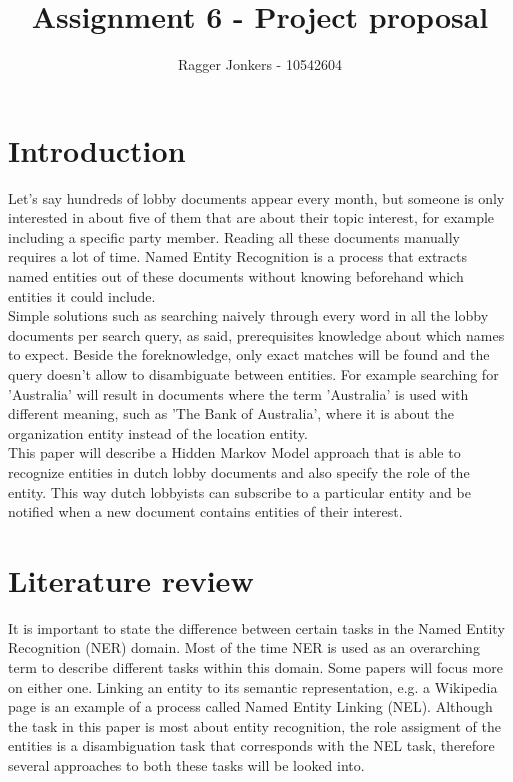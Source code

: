 \documentclass{article}
\title{Assignment 6 - Project proposal}
\author{Ragger Jonkers - 10542604}
\begin{document}
\setlength{\parindent}{0cm}

\maketitle

\section{Introduction}
Let's say hundreds of lobby documents appear every month, but someone is only interested in about five of them that are about their topic interest, for example including a specific party member. Reading all these documents manually requires a lot of time. Named Entity Recognition  is a process that extracts named entities out of these documents without knowing beforehand which entities it could include. \\

Simple solutions such as searching naively through every word in all the lobby documents per search query, as said, prerequisites knowledge about which names to expect. Beside the foreknowledge, only exact matches will be found and the query doesn't allow to disambiguate between entities. For example searching for 'Australia' will result in documents where the term 'Australia' is used with different meaning, such as 'The Bank of Australia', where it is about the organization entity instead of the location entity.\\

This paper will describe a Hidden Markov Model approach that is able to recognize entities in dutch lobby documents and also specify the role of the entity. This way dutch lobbyists can subscribe to a particular entity and be notified when a new document contains entities of their interest.

\section{Literature review}
It is important to state the difference between certain tasks in the Named Entity Recognition (NER) domain. Most of the time NER is used as an overarching term to describe different tasks within this domain. Some papers will focus more on either one. Linking an entity to its semantic representation, e.g. a Wikipedia page \cite{hachey2011graph} is an example of a process called Named Entity Linking (NEL). Although the task in this paper is most about entity recognition, the role assigment of the entities is a disambiguation task that corresponds with the NEL task, therefore several approaches to both these tasks will be looked into.\\
\end{document}
